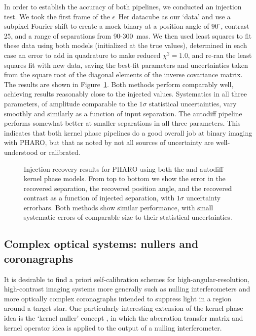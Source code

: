 \documentclass[modern]{aastex63}
\begin{document}
In order to establish the accuracy of both pipelines, we conducted an injection test. We took the first frame of the $\epsilon$~Her datacube as our `data' and use a subpixel Fourier shift to create a mock binary at a position angle of $90^\circ$, contrast 25, and a range of separations from 90-300~mas. We then used least squares to fit these data using both models (initialized at the true values), determined in each case an error to add in quadrature to make reduced $\chi^2=1.0$, and re-ran the least squares fit with new data, saving the best-fit parameters and uncertainties taken from the square root of the diagonal elements of the inverse covariance matrix. The results are shown in Figure~\ref{injection_recovery}. Both methods perform comparably well, achieving results reasonably close to the injected values. Systematics in all three parameters, of amplitude comparable to the $1\sigma$ statistical uncertainties, vary smoothly and similarly as a function of input separation. The autodiff pipeline performs somewhat better at smaller separations in all three parameters. This indicates that both kernel phase pipelines do a good overall job at binary imaging with PHARO, but that as noted by \citet{martinache20} not all sources of uncertainty are well-understood or calibrated.

\begin{figure}
     \caption{Injection recovery results for PHARO using both the \citet{martinache20} and autodiff kernel phase models. From top to bottom we show the error in the recovered separation, the recovered position angle, and the recovered contrast as a function of injected separation, with $1\sigma$ uncertainty errorbars. Both methods show similar performance, with small systematic errors of comparable size to their statistical uncertainties. \href{https://github.com/benjaminpope/morphine/blob/stable/notebooks/frantz_test.ipynb}{\color{linkcolor}\faGithub}}
    \label{injection_recovery}
\end{figure}


\subsection{Complex optical systems: nullers and coronagraphs}
\label{sec:coronagraph}

It is desirable to find a priori self-calibration schemes for high-angular-resolution, high-contrast imaging systems more generally such as nulling interferometers and more optically complex coronagraphs intended to suppress light in a region around a target star. One particularly interesting extension of the kernel phase idea is the `kernel nuller' concept \citep{martinache18}, in which the aberration transfer matrix and kernel operator idea is applied to the output of a nulling interferometer. 
\end{document}
